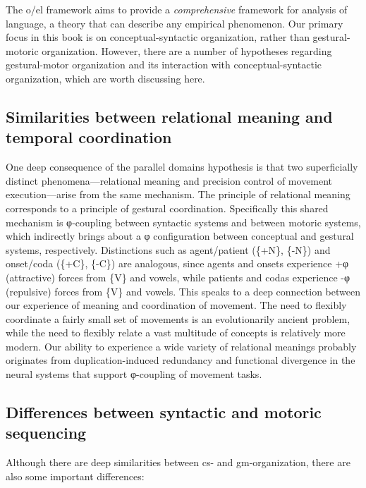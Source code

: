 The o/el framework aims to provide a \textit{comprehensive} framework for analysis of language, a theory that can describe any empirical phenomenon. Our primary focus in this book is on conceptual-syntactic organization, rather than gestural-motoric organization. However, there are a number of hypotheses regarding gestural-motor organization and its interaction with conceptual-syntactic organization, which are worth discussing here.

\subsection{Similarities between relational meaning and temporal coordination}

One deep consequence of the parallel domains hypothesis is that two superficially distinct phenomena—relational meaning and precision control of movement execution—arise from the same mechanism. The principle of relational meaning corresponds to a principle of gestural coordination. Specifically this shared mechanism is φ-coupling between syntactic systems and between motoric systems, which indirectly brings about a φ configuration between conceptual and gestural systems, respectively. Distinctions such as agent/patient (\{+N\}, \{-N\}) and onset/coda (\{+C\}, \{-C\}) are analogous, since agents and onsets experience +φ (attractive) forces from \{V\} and vowels, while patients and codas experience -φ (repulsive) forces from \{V\} and vowels. This speaks to a deep connection between our experience of meaning and coordination of movement. The need to flexibly coordinate a fairly small set of movements is an evolutionarily ancient problem, while the need to flexibly relate a vast multitude of concepts is relatively more modern. Our ability to experience a wide variety of relational meanings probably originates from duplication-induced redundancy and functional divergence in the neural systems that support φ-coupling of movement tasks. 

\subsection{Differences between syntactic and motoric sequencing} 

Although there are deep similarities between cs- and gm-organization, there are also some important differences: 

